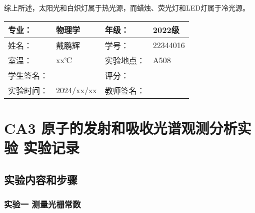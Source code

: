 \documentclass[dvipsnames, svgnames,a4paper,11pt]{article}
\begin{document}
	综上所述，太阳光和白炽灯属于热光源，而蜡烛、荧光灯和LED灯属于冷光源。

	

\clearpage
\begin{table}
	\renewcommand\arraystretch{1.7}
	\centering
	\begin{tabularx}{\textwidth}{|X|X|X|X|}
	\hline
	专业：& 物理学 &年级：& 2022级 \\
	\hline
	姓名：& 戴鹏辉 & 学号：& 22344016 \\
	\hline
	室温：& xx℃ & 实验地点： & A508 \\
	\hline
	学生签名：& & 评分： &\\
	\hline
	实验时间：& 2024/xx/xx & 教师签名：&\\
	\hline
	\end{tabularx}
\end{table}

\section{CA3 \quad 原子的发射和吸收光谱观测分析实验 \quad\heiti 实验记录}
\subsection{实验内容和步骤}

	\subsubsection{实验一 测量光栅常数}
	
\end{document}

